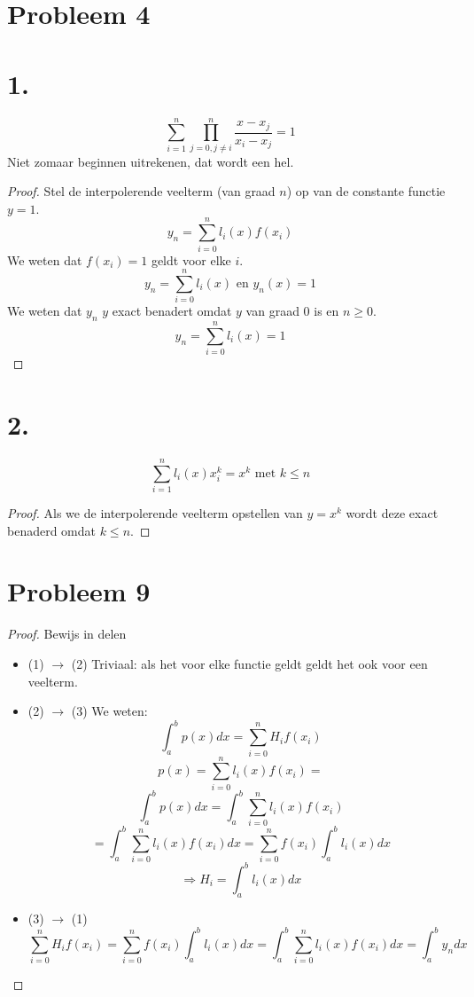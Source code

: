 \documentclass[12pt,a4paper]{article}
\begin{document}
\section{Probleem 4}
\section*{1.}
\[
\sum_{i=1}^{n}\prod_{j=0,j\neq i}^{n}\frac{x-x_j}{x_i-x_j}=1
\]
Niet zomaar beginnen uitrekenen, dat wordt een hel.
\begin{proof}
Stel de interpolerende veelterm (van graad $n$) op van de constante functie $y = 1$.
\[
y_n = \sum_{i=0}^{n}l_{i}(x)f(x_i)
\]
We weten dat $f(x_i) = 1$ geldt voor elke $i$.
\[
y_n = \sum_{i=0}^{n}l_{i}(x) \text{ en } y_n(x) = 1
\]
We weten dat $y_n$ $y$ exact benadert omdat $y$ van graad $0$ is en $n\ge 0$. 
\[
y_n = \sum_{i=0}^{n}l_{i}(x) = 1
\]
\end{proof}

\section*{2.}
\[
\sum_{i=1}^{n}l_i(x)x_{i}^{k}=x^{k} \text{ met } k \le n
\]
\begin{proof}
Als we de interpolerende veelterm opstellen van $y=x^k$ wordt deze exact benaderd omdat $k\le n$.
\end{proof}

\section{Probleem 9}
\begin{proof} Bewijs in delen
\begin{itemize}
\item (1) $\rightarrow$ (2) Triviaal: als het voor elke functie geldt geldt het ook voor een veelterm.
\item (2) $\rightarrow$ (3)
We weten:
\[
\int_{a}^{b}p(x)dx = \sum_{i=0}^{n}H_if(x_i)
\]
\[
p(x) = \sum_{i=0}^{n}l_i(x)f(x_i) =
\]
\[
\int_{a}^{b}p(x)dx = \int_{a}^{b}\sum_{i=0}^{n}l_i(x)f(x_i)
\]
\[
= \int_{a}^{b}\sum_{i=0}^{n}l_i(x)f(x_i)dx
= \sum_{i=0}^{n}f(x_i)\int_{a}^{b}l_i(x)dx
\]
\[
\Rightarrow H_i = \int_{a}^{b}l_i(x)dx
\]
\item (3) $\rightarrow$ (1)
\[
\sum_{i=0}^{n}H_if(x_i)
= \sum_{i=0}^{n}f(x_i)\int_{a}^{b}l_i(x)dx
= \int_{a}^{b}\sum_{i=0}^{n}l_i(x)f(x_i)dx
= \int_{a}^{b}y_ndx
\]
\end{itemize}
\end{proof}
\end{document}

